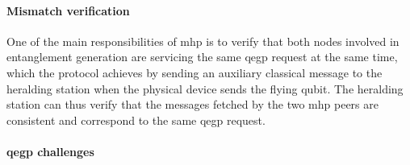 \paragraph{Mismatch verification}

One of the main responsibilities of \acrshort{mhp} is to verify that both nodes involved in
entanglement generation are servicing the same \acrshort{qegp} request at the same time, which the
protocol achieves by sending an auxiliary classical message to the heralding station when the
physical device sends the flying qubit. The heralding station can thus verify that the messages
fetched by the two \acrshort{mhp} peers are consistent and correspond to the same \acrshort{qegp}
request.

\paragraph{\acrshort{qegp} challenges}

